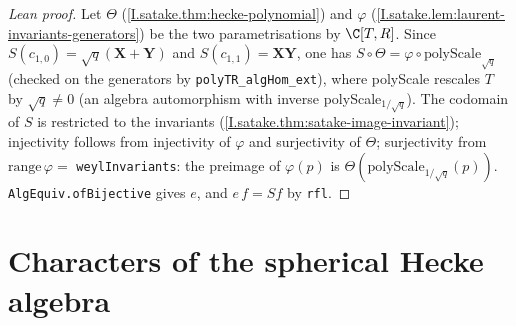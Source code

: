 \begin{proof}[Lean proof]
Let $\Theta$ (\cref{I.satake.thm:hecke-polynomial}) and $\varphi$ (\cref{I.satake.lem:laurent-invariants-generators}) be the two parametrisations by $\C[T,R]$. Since $S(c_{1,0})=\sqrt q(\mathbf X+\mathbf Y)$ and $S(c_{1,1})=\mathbf X\mathbf Y$, one has $S\circ\Theta=\varphi\circ\mathrm{polyScale}_{\sqrt q}$ (checked on the generators by \texttt{polyTR\_algHom\_ext}), where polyScale rescales $T$ by $\sqrt q\ne0$ (an algebra automorphism with inverse polyScale$_{1/\sqrt q}$). The codomain of $S$ is restricted to the invariants (\cref{I.satake.thm:satake-image-invariant}); injectivity follows from injectivity of $\varphi$ and surjectivity of $\Theta$; surjectivity from $\mathrm{range}\,\varphi=$ \texttt{weylInvariants}: the preimage of $\varphi(p)$ is $\Theta(\mathrm{polyScale}_{1/\sqrt q}(p))$. \texttt{AlgEquiv.ofBijective} gives $e$, and $e\,f=S f$ by \texttt{rfl}.
\end{proof}

\section{Characters of the spherical Hecke algebra}

